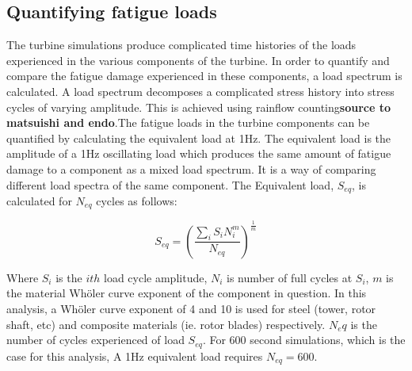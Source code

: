 \subsection{Quantifying fatigue loads}
The turbine simulations produce complicated time histories of the loads experienced in the various components of the turbine. In order to quantify and compare the fatigue damage experienced in these components, a load spectrum is calculated. A load spectrum decomposes a complicated stress history into stress cycles of varying amplitude. This is achieved using rainflow counting\textbf{source to matsuishi and endo}.The fatigue loads in the turbine components can be quantified by calculating the equivalent load at 1Hz. The equivalent load is the amplitude of a 1Hz oscillating load which produces the same amount of fatigue damage to a component as a mixed load spectrum. It is a way of comparing different load spectra of the same component. The Equivalent load, $S_{eq}$, is calculated for $N_{eq}$ cycles as follows:

$$S_{eq} = \left(\frac{\sum_i S_iN_i^m}{N_{eq}}\right)^{\frac{1}{m}}$$

Where $S_i$ is the $ith$ load cycle amplitude, $N_i$ is number of full cycles at $S_i$, $m$ is the material Wh\"{o}ler curve exponent of the component in question. In this analysis, a Wh\"{o}ler curve exponent of 4 and 10 is used for steel (tower, rotor shaft, etc) and composite materials (ie. rotor blades) respectively. $N_eq$ is the number of cycles experienced of load $S_{eq}$. For 600 second simulations, which is the case for this analysis, A 1Hz equivalent load requires $N_{eq}=600$. 
